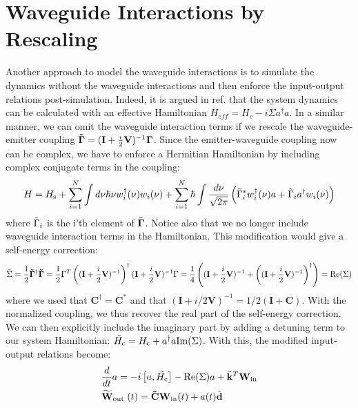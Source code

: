 \section{Waveguide Interactions by Rescaling} \label{sec:inferringwaveguide}
Another approach to model the waveguide interactions is to simulate the dynamics without the waveguide interactions and then enforce the input-output relations post-simulation. Indeed, it is argued in ref. \cite{Xu2016FanoTransport} that the system dynamics can be calculated with an effective Hamiltonian $H_{eff} = H_c - i\Sigma a^\dagger a$. In a similar manner, we can omit the waveguide interaction terms if we rescale the waveguide-emitter coupling $\mathbf{\Tilde{\Gamma}} = (\mathbf{I} + \frac{i}{2}\mathbf{V})^{-1} \mathbf{\Gamma}$. Since the emitter-waveguide coupling now can be complex, we have to enforce a Hermitian Hamiltonian by including complex conjugate terms in the coupling:
\begin{equation}
\begin{aligned}
H= H_{\mathrm{s}}+ \sum_{i=1}^N \int d \nu \hbar \nu w_{i}^{\dagger}(\nu) w_{i}(\nu)+\sum_{i=1}^N \hbar \int \frac{d \nu}{\sqrt{2 \pi}}\left(\Tilde{\Gamma}_i^* w_{i}^{\dagger}(\nu) a+ \Tilde{\Gamma}_i a^{\dagger} w_{i}(\nu)\right) \label{eq:modifiedFAN}
\end{aligned}
\end{equation}
where $\Tilde{\Gamma}_i$ is the i'th element of $\Tilde{\mathbf{\Gamma}}$. Notice also that we no longer include waveguide interaction terms in the Hamiltonian. This modification would give a self-energy correction:
\begin{equation}
    \Tilde{\Sigma} = \frac{1}{2} \mathbf{\Tilde{\Gamma}}^\dagger \mathbf{\Tilde{\Gamma}} = \frac{1}{2} \Gamma^T \left ((\mathbf{I} + \frac{i}{2}\mathbf{V})^{-1}\right)^\dagger (\mathbf{I} + \frac{i}{2}\mathbf{V})^{-1} \Gamma = \frac{1}{4}\left (  (\mathbf{I} + \frac{i}{2}\mathbf{V})^{-1} + \left( (\mathbf{I} + \frac{i}{2}\mathbf{V})^{-1}\right)^\dagger \right) = \mathrm{Re}(\Sigma)
\end{equation}
where we used that $\mathbf{C}^\dagger = \mathbf{C}^*$ and that $(\mathbf{I} + i/2 \mathbf{V})^{-1} = 1/2(\mathbf{I}+\mathbf{C})$. With the normalized coupling, we thus recover the real part of the self-energy correction. We can then explicitly include the imaginary part by adding a detuning term to our system Hamiltonian: $\Tilde{H_{\mathrm{c}}} = H_{\mathrm{c}} + a^\dagger a \mathrm{Im}(\Sigma)$. With this, the modified input-output relations become:
\begin{align}
& \frac{d}{d t} a= -i\left[a, \Tilde{H_{\mathrm{c}}} \right] -\mathrm{Re}(\Sigma) a + \Tilde{\mathbf{k}}^T \mathbf{W}_{\mathrm{in}} \label{eq:scaledIO1} \\
& \widetilde{\mathbf{W}}_{\text {out }}(t)= \mathbf{\Tilde{C}} \mathbf{W}_{\mathrm{in}}(t)+a(t)\Tilde{\mathbf{d}} \label{eq:scaledIO2}
\end{align}
